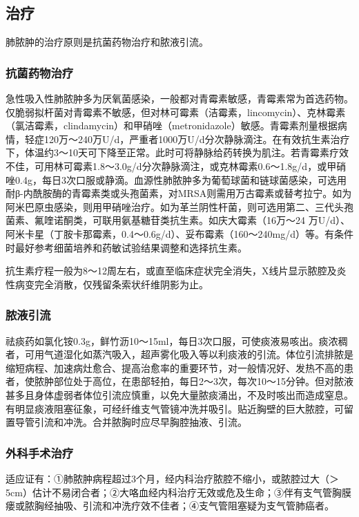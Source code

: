 \subsection{治疗}

肺脓肿的治疗原则是抗菌药物治疗和脓液引流。

\subsubsection{抗菌药物治疗}

急性吸入性肺脓肿多为厌氧菌感染，一般都对青霉素敏感，青霉素常为首选药物。仅脆弱拟杆菌对青霉素不敏感，但对林可霉素（洁霉素，lincomycin）、克林霉素（氯洁霉素，clindamycin）和甲硝唑（metronidazole）敏感。青霉素剂量根据病情，轻症120万～240万U/d，严重者1000万U/d分次静脉滴注。在有效抗生素治疗下，体温约3～10天可下降至正常。此时可将静脉给药转换为肌注。若青霉素疗效不佳，可用林可霉素1.8～3.0g/d分次静脉滴注，或克林霉素0.6～1.8g/d，或甲硝唑0.4g，每日3次口服或静滴。血源性肺脓肿多为葡萄球菌和链球菌感染，可选用耐β-内酰胺酶的青霉素类或头孢菌素，对MRSA则需用万古霉素或替考拉宁。如为阿米巴原虫感染，则用甲硝唑治疗。如为革兰阴性杆菌，则可选用第二、三代头孢菌素、氟喹诺酮类，可联用氨基糖苷类抗生素。如庆大霉素（16万～24
万U/d）、阿米卡星（丁胺卡那霉素，0.4～0.6g/d）、妥布霉素（160～240mg/d）等。有条件时最好参考细菌培养和药敏试验结果调整和选择抗生素。

抗生素疗程一般为8～12周左右，或直至临床症状完全消失，X线片显示脓腔及炎性病变完全消散，仅残留条索状纤维阴影为止。

\subsubsection{脓液引流}

祛痰药如氯化铵0.3g，鲜竹沥10～15ml，每日3次口服，可使痰液易咳出。痰浓稠者，可用气道湿化如蒸汽吸入，超声雾化吸入等以利痰液的引流。体位引流排脓是缩短病程、加速病灶愈合、提高治愈率的重要环节，对一般情况好、发热不高的患者，使脓肿部位处于高位，在患部轻拍，每日2～3次，每次10～15分钟。但对脓液甚多且身体虚弱者体位引流应慎重，以免大量脓痰涌出，不及时咳出而造成窒息。有明显痰液阻塞征象，可经纤维支气管镜冲洗并吸引。贴近胸壁的巨大脓腔，可留置导管引流和冲洗。合并脓胸时应尽早胸腔抽液、引流。

\subsubsection{外科手术治疗}

适应证有：①肺脓肿病程超过3个月，经内科治疗脓腔不缩小，或脓腔过大（＞
5cm）估计不易闭合者；②大咯血经内科治疗无效或危及生命；③伴有支气管胸膜瘘或脓胸经抽吸、引流和冲洗疗效不佳者；④支气管阻塞疑为支气管肺癌者。

